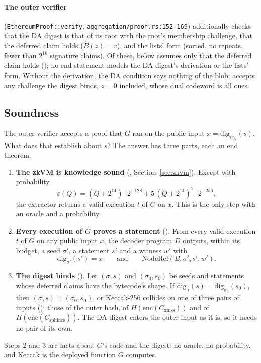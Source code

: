 \documentclass[11pt]{article}
\newcommand{\Cx}{C_{\mathrm{xmss}}}
\newcommand{\Cs}{C_{\mathrm{sphincs}}}
\newcommand{\enc}{\mathrm{enc}}
\begin{document}
\paragraph{The outer verifier} (\texttt{EthereumProof::verify}, \texttt{aggregation/proof.rs:152-169})
additionally checks that the DA digest is that of its root with the root's membership
challenge, that the deferred claim holds ($\widehat{B}(z) = v$), and the lists' form
(sorted, no repeats, fewer than $2^{16}$ signature claims). Of these,  below
assumes only that the deferred claim holds (); no end statement
models the DA digest's derivation or the lists' form. Without the derivation, the DA condition says
nothing of the blob:  accepts any challenge the digest binds, $z = 0$
included, whose dual codeword is all ones.

\subsection{Soundness}

The outer verifier accepts a proof that $G$ ran on the public input $x = \mathrm{dig}_{iv_G}(s)$.
What does that establish about $s$? The answer has three parts, each an end theorem.
\begin{enumerate}
\item \textbf{The zkVM is knowledge sound} (,
Section~\ref{sec:zkvm}). Except with probability
\[
\varepsilon(Q) = (Q+2^{14})\cdot 2^{-128} + 5\,(Q+2^{14})^2\cdot 2^{-256},
\]
the extractor returns a valid execution $t$ of $G$ on $x$. This is the only step with an oracle
and a probability.
\item \textbf{Every execution of $G$ proves a statement} (). From
every valid execution $t$ of $G$ on any public input $x$, the decoder program $D$ outputs, within
its budget, a seed $\sigma'$, a statement $s'$ and a witness $w'$ with
\[
\mathrm{dig}_{\sigma'}(s') = x \qquad\text{and}\qquad \mathrm{NodeRel}(B, \sigma', s', w').
\]
\item \textbf{The digest binds} (). Let $(\sigma, s)$ and $(\sigma_0, s_0)$
be seeds and statements whose deferred claims have the bytecode's shape. If
$\mathrm{dig}_\sigma(s) = \mathrm{dig}_{\sigma_0}(s_0)$, then $(\sigma, s) = (\sigma_0, s_0)$, or
Keccak-256 collides on one of three pairs of inputs (): those of the
outer hash, of $H(\enc(\Cx))$ and of $H(\enc(\Cs))$. The DA digest enters the outer input as it
is, so it needs no pair of its own.
\end{enumerate}
Steps 2 and 3 are facts about $G$'s code and the digest: no oracle, no probability, and Keccak is
the deployed function $G$ computes.
\end{document}
